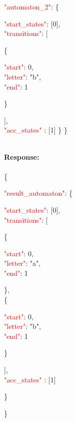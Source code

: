    \begin{adjustwidth}{7.5 mm}{0 cm}

   \textcolor{red}{"automaton\_2"}: \{
     \begin{adjustwidth}{7.5 mm}{0 cm}
            \textcolor{red}{"start\_states"}: [0],\\
            \textcolor{red}{"transitions"}: [
            \begin{adjustwidth}{7.5 mm}{0 cm}
            \{
               \begin{adjustwidth}{7.5 mm}{0 cm}
                    \textcolor{red}{"start"}: 0,\\
                    \textcolor{red}{"letter"}: "b",\\
                    \textcolor{red}{"end"}: 1
               \end{adjustwidth}
            \}
            \end{adjustwidth}
            ],\\
        \textcolor{red}{"acc\_states" }: [1]  \} \}
    \end{adjustwidth}
\end{adjustwidth}
\ \\
\textbf{Response:}\\
\ \\
 \{
 \begin{adjustwidth}{7.5 mm}{0 cm}
    \textcolor{red}{"result\_automaton"}: \{
        \begin{adjustwidth}{7.5 mm}{0 cm}
            \textcolor{red}{"start\_states"}: [0],\\
            \textcolor{red}{"transitions"}: [
            \begin{adjustwidth}{7.5 mm}{0 cm}
            \{
               \begin{adjustwidth}{7.5 mm}{0 cm}
                    \textcolor{red}{"start"}: 0,\\
                    \textcolor{red}{"letter"}: "a",\\
                    \textcolor{red}{"end"}: 1
               \end{adjustwidth}
            \},\\
            \{
               \begin{adjustwidth}{7.5 mm}{0 cm}
                    \textcolor{red}{"start"}: 0,\\
                    \textcolor{red}{"letter"}: "b",\\
                    \textcolor{red}{"end"}: 1
               \end{adjustwidth}
            \}
            \end{adjustwidth}
            ],\\
        \textcolor{red}{"acc\_states" }: [1]
    \end{adjustwidth}
    \}
\end{adjustwidth}
\}


